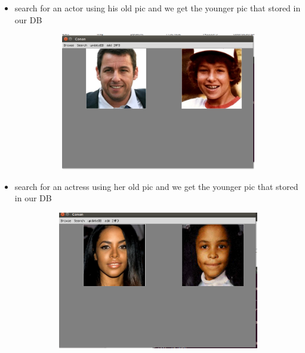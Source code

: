 \documentclass[pdftex,10pt,a4paper,oneside]{article}
\begin{document}
\begin{itemize}
\begin{figure}[H]
\end{figure}
\item search for an actor  using his old pic and we get the younger pic that stored in our DB 
	\begin{figure}[H]
	\centering
	\includegraphics[width=120mm,height=60mm]{fig/12.png}
\end{figure}
\pagebreak
\item search for an actress  using her old pic and we get the younger pic that stored in our DB 
	\begin{figure}[H]
	\centering
	\includegraphics[width=120mm,height=60mm]{fig/13.png}
\end{figure}
\end{itemize}
	\pagebreak
\end{document}

